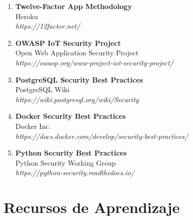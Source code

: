 \begin{enumerate}

    \item \textbf{Twelve-Factor App Methodology} \\
    Heroku \\
    \textit{https://12factor.net/}

    \item \textbf{OWASP IoT Security Project} \\
    Open Web Application Security Project \\
    \textit{https://owasp.org/www-project-iot-security-project/}

    \item \textbf{PostgreSQL Security Best Practices} \\
    PostgreSQL Wiki \\
    \textit{https://wiki.postgresql.org/wiki/Security}

    \item \textbf{Docker Security Best Practices} \\
    Docker Inc. \\
    \textit{https://docs.docker.com/develop/security-best-practices/}

    \item \textbf{Python Security Best Practices} \\
    Python Security Working Group \\
    \textit{https://python-security.readthedocs.io/}

\end{enumerate}

\section{Recursos de Aprendizaje}

